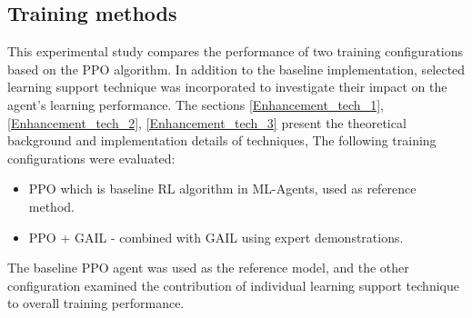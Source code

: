 \subsection{Training methods}

This experimental study compares the performance of two training configurations based on the PPO algorithm. In addition to the baseline implementation, selected learning support technique was incorporated to investigate their impact on the agent's learning performance. The sections \ref{Enhancement_tech_1}, \ref{Enhancement_tech_2}, \ref{Enhancement_tech_3} present the theoretical background and implementation details of techniques,
The following training configurations were evaluated:
\begin{itemize}
	\item PPO which is baseline RL algorithm in ML-Agents, used as reference method.
	\item PPO + GAIL - combined with GAIL using expert demonstrations.
\end{itemize}
The baseline PPO agent was used as the reference model, and the other configuration examined the contribution of individual learning support technique to overall training performance.

